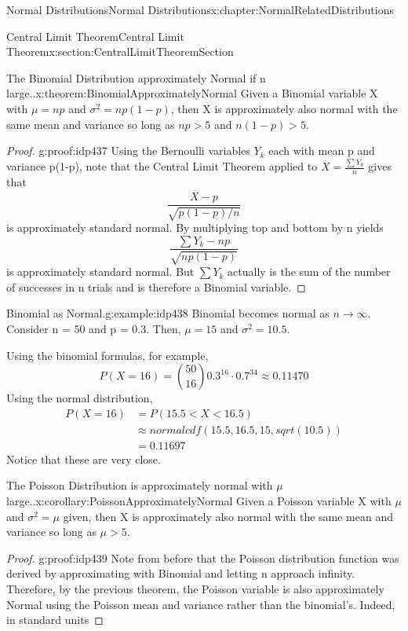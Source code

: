 \documentclass[oneside,10pt,]{book}
\numberwithin{equation}{section}
\newcommand{\lt}{<}
\newcommand{\gt}{>}
\begin{document}
\begin{chapterptx}{Normal Distributions}{}{Normal Distributions}{}{}{x:chapter:NormalRelatedDistributions}
\begin{sectionptx}{Central Limit Theorem}{}{Central Limit Theorem}{}{}{x:section:CentralLimitTheoremSection}
\begin{theorem}{The Binomial Distribution approximately Normal if n large..}{}{x:theorem:BinomialApproximatelyNormal}
Given a Binomial variable X with \(\mu = np\) and \(\sigma^2 = np(1-p)\), then X is approximately also normal with the same mean and variance so long as \(np \gt 5\) and \(n(1-p) \gt 5\).%
\end{theorem}
\begin{proof}{}{g:proof:idp437}
Using the Bernoulli variables \(Y_k\) each with mean p and variance p(1-p), note that the Central Limit Theorem applied to \(\overline{X} = \frac{\sum Y_k}{n}\) gives that%
\begin{equation*}
\frac{\overline{X}-p}{\sqrt{p(1-p)/n}}
\end{equation*}
is approximately standard normal. By multiplying top and bottom by n yields%
\begin{equation*}
\frac{\sum Y_k - np}{\sqrt{np(1-p)}}
\end{equation*}
is approximately standard normal. But \(\sum Y_k\) actually is the sum of the number of successes in n trials and is therefore a Binomial variable.%
\end{proof}
\begin{example}{Binomial as Normal.}{g:example:idp438}%
Binomial becomes normal as \(n \rightarrow \infty\).  Consider n = 50 and p = 0.3.  Then, \(\mu = 15\) and \(\sigma^2 = 10.5\).%
\par
Using the binomial formulas, for example,%
\begin{equation*}
P( X = 16 ) = \binom{50}{16} 0.3^{16} \cdot 0.7^{34} \approx 0.11470
\end{equation*}
Using the normal distribution,%
\begin{align*}
P( X = 16 ) & = P( 15.5 \lt X \lt 16.5) \\
& \approx normalcdf(15.5,16.5,15,sqrt(10.5)) \\
& = 0.11697
\end{align*}
Notice that these are very close.%
\end{example}
\begin{corollary}{The Poisson Distribution is approximately normal with \(\mu\) large..}{}{x:corollary:PoissonApproximatelyNormal}%
Given a Poisson variable X with \(\mu\) and \(\sigma^2 = \mu\) given, then X is approximately also normal with the same mean and variance so long as \(\mu \gt 5\).%
\end{corollary}
\begin{proof}{}{g:proof:idp439}
Note from before that the Poisson distribution function was derived by approximating with Binomial and letting n approach infinity. Therefore, by the previous theorem, the Poisson variable is also approximately Normal using the Poisson mean and variance rather than the binomial's. Indeed, in standard units%

\end{proof}
\end{sectionptx}
\end{chapterptx}
\end{document}
